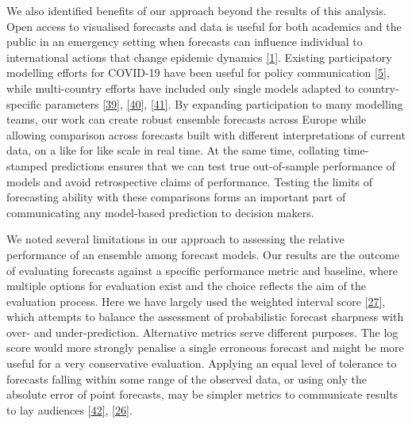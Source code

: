 \documentclass[
]{article}
\begin{document}
We also identified benefits of our approach beyond the results of this
analysis. Open access to visualised forecasts and data is useful for
both academics and the public in an emergency setting when forecasts can
influence individual to international actions that change epidemic
dynamics \protect\hyperlink{ref-basshuysenThreeWaysWhich2021}{{[}1{]}}.
Existing participatory modelling efforts for COVID-19 have been useful
for policy communication
\protect\hyperlink{ref-cdcCoronavirusDisease20192020}{{[}5{]}}, while
multi-country efforts have included only single models adapted to
country-specific parameters
\protect\hyperlink{ref-aguasModellingCOVID19Pandemic2020}{{[}39{]}},
\protect\hyperlink{ref-adibParticipatoryModellingApproach2021}{{[}40{]}},
\protect\hyperlink{ref-agostoMonitoringCOVID19Contagion2021}{{[}41{]}}.
By expanding participation to many modelling teams, our work can create
robust ensemble forecasts across Europe while allowing comparison across
forecasts built with different interpretations of current data, on a
like for like scale in real time. At the same time, collating
time-stamped predictions ensures that we can test true out-of-sample
performance of models and avoid retrospective claims of performance.
Testing the limits of forecasting ability with these comparisons forms
an important part of communicating any model-based prediction to
decision makers.

We noted several limitations in our approach to assessing the relative
performance of an ensemble among forecast models. Our results are the
outcome of evaluating forecasts against a specific performance metric
and baseline, where multiple options for evaluation exist and the choice
reflects the aim of the evaluation process. Here we have largely used
the weighted interval score
\protect\hyperlink{ref-gneitingStrictlyProperScoring2007}{{[}27{]}},
which attempts to balance the assessment of probabilistic forecast
sharpness with over- and under-prediction. Alternative metrics serve
different purposes. The log score would more strongly penalise a single
erroneous forecast and might be more useful for a very conservative
evaluation. Applying an equal level of tolerance to forecasts falling
within some range of the observed data, or using only the absolute error
of point forecasts, may be simpler metrics to communicate results to lay
audiences
\protect\hyperlink{ref-reichReplyBracherScoring2019}{{[}42{]}},
\protect\hyperlink{ref-bracherEvaluatingEpidemicForecasts2021}{{[}26{]}}.
\end{document}
